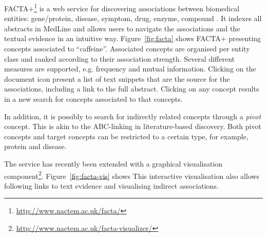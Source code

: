 FACTA+\footnote{\url{http://www.nactem.ac.uk/facta/}} is a web service for discovering associations between biomedical entities: gene/protein, disease, symptom, drug, enzyme, compound \citep{Tsuruoka2008FACTA}.
It indexes all abstracts in MedLine and allows users to navigate the associations and the textual evidence in an intuitive way.
Figure~\ref{fig:facta} shows FACTA+ presenting concepts associated to ``caffeine''.
Associated concepts are organised per entity class and ranked according to their association strength.
Several different measures are supported, e.g. frequency and mutual information.
Clicking on the document icon present a list of text snippets that are the source for the associations, including a link to the full abstract.
Clicking on any concept results in a new search for concepts associated to that concepts. 

In addition, it is possibly to search for indirectly related concepts through a \emph{pivot} concept.
This is akin to the ABC-linking in literature-based discovery.
Both pivot concepts and target concepts can be restricted to a certain type, for example, protein and disease.

The service has recently been extended with a graphical visualisation component\footnote{\url{http://www.nactem.ac.uk/facta-visualizer/}}.
Figure~\ref{fig:facta-vis} shows 
This interactive visualisation also allows following links to text evidence and visualising indirect associations.

